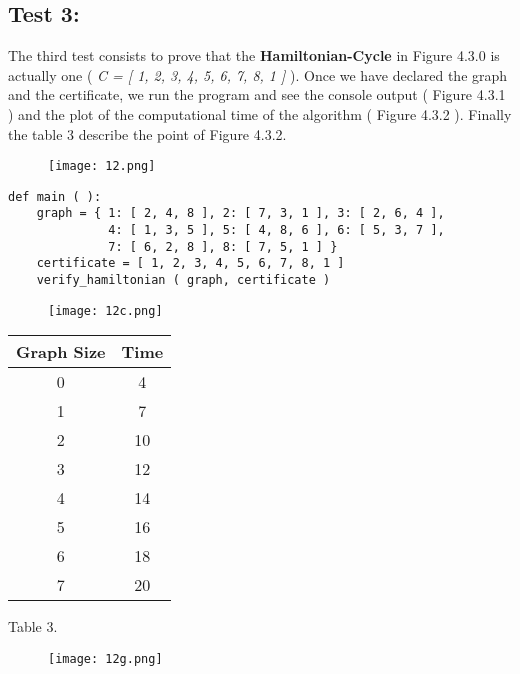 \subsection{Test 3:}

The third test consists to prove that the {\bfseries Hamiltonian-Cycle} in Figure 4.3.0 is actually one ( {\itshape C = [ 1, 2, 3, 4, 5, 6, 7, 8, 1 ]} ). Once we have declared the graph and the certificate, we run the program and see the console output ( Figure 4.3.1 ) and the plot of the computational time of the algorithm ( Figure 4.3.2 ). Finally the table 3 describe the point of Figure 4.3.2. \hfill \break

\begin{figure}[H]
\texttt{[image: 12.png]}
\centering \linebreak {}
\end{figure} \hfill \break

\begin{lstlisting}
def main ( ):
    graph = { 1: [ 2, 4, 8 ], 2: [ 7, 3, 1 ], 3: [ 2, 6, 4 ],
              4: [ 1, 3, 5 ], 5: [ 4, 8, 6 ], 6: [ 5, 3, 7 ],
              7: [ 6, 2, 8 ], 8: [ 7, 5, 1 ] }
    certificate = [ 1, 2, 3, 4, 5, 6, 7, 8, 1 ]
    verify_hamiltonian ( graph, certificate )
\end{lstlisting} \hfill \break

\begin{figure}[H]
\texttt{[image: 12c.png]}
\centering \linebreak {}
\end{figure} \hfill \break

\begin{center}
\begin{tabular}{c c}
\toprule \toprule
\hspace{100px} Graph Size \hspace{90px} & \hspace{100px} Time \hspace{90px} \\
\midrule \midrule
0 & 4 \\
\midrule
1 & 7 \\
\midrule
2 & 10 \\
\midrule
3 & 12 \\
\midrule
4 & 14 \\
\midrule
5 & 16 \\
\midrule
6 & 18 \\
\midrule
7 & 20 \\
\bottomrule
\end{tabular}
\centering \linebreak \linebreak Table 3.
\end{center}

\begin{figure}[H]
\texttt{[image: 12g.png]}
\centering \linebreak {}
\end{figure} \hfill \break